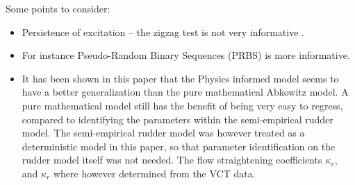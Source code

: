 Some points to consider:
\begin{itemize}
    \item Persistence of excitation -- the zigzag test is not very informative \citep{sutulo_algorithm_2014}.
    \item For instance Pseudo-Random Binary Sequences (PRBS) \citep{landau_digital_2006} is more informative.
    \item It has been shown in this paper that the Physics informed model seems to have a better generalization than the pure mathematical Abkowitz model. A pure mathematical model still has the benefit of being very easy to regress, compared to
          identifying the parameters within the semi-empirical rudder model. The semi-empirical rudder model was however treated as a deterministic model in this paper, so that parameter identification on the rudder model itself was not needed. The flow straightening coefficients $\kappa_v$, and $\kappa_r$ where however determined from the VCT data.
\end{itemize}